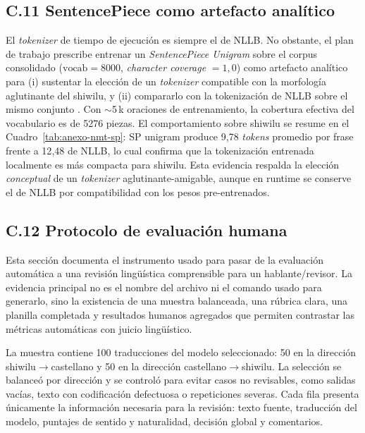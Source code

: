 \documentclass[12pt,a4paper,oneside]{book}
\begin{document}
\subsection*{C.11 SentencePiece como artefacto analítico}\label{anexo-nmt-sentencepiece}

El \emph{tokenizer} de tiempo de ejecución es siempre el de NLLB. No obstante, el plan de trabajo prescribe entrenar un \emph{SentencePiece Unigram} sobre el corpus consolidado (\(\text{vocab} = 8000\), \emph{character coverage} \(= 1{,}0\)) como artefacto analítico para (i) sustentar la elección de un \emph{tokenizer} compatible con la morfología aglutinante del shiwilu, y (ii) compararlo con la tokenización de NLLB sobre el mismo conjunto \parencite{kudo2018sentencepiece,sennrich2016bt}. Con \(\sim\)5\,k oraciones de entrenamiento, la cobertura efectiva del vocabulario es de 5276 piezas. El comportamiento sobre shiwilu se resume en el Cuadro~\ref{tab:anexo-nmt-sp}: SP unigram produce 9{,}78 \emph{tokens} promedio por frase frente a 12{,}48 de NLLB, lo cual confirma que la tokenización entrenada localmente es más compacta para shiwilu. Esta evidencia respalda la elección \emph{conceptual} de un \emph{tokenizer} aglutinante-amigable, aunque en runtime se conserve el de NLLB por compatibilidad con los pesos pre-entrenados.

\begin{table}[h]
\centering
\caption{Tokens promedio por oración de shiwilu: SP Unigram entrenado en este trabajo vs. el \emph{tokenizer} multilingüe de NLLB-200 (variante \texttt{xl}).}
\label{tab:anexo-nmt-sp}

\end{table}

\subsection*{C.12 Protocolo de evaluación humana}\label{anexo-nmt-human-eval}

Esta sección documenta el instrumento usado para pasar de la evaluación automática a una revisión lingüística comprensible para un hablante/revisor. La evidencia principal no es el nombre del archivo ni el comando usado para generarlo, sino la existencia de una muestra balanceada, una rúbrica clara, una planilla completada y resultados humanos agregados que permiten contrastar las métricas automáticas con juicio lingüístico.

La muestra contiene 100 traducciones del modelo seleccionado: 50 en la dirección shiwilu\(\rightarrow\)castellano y 50 en la dirección castellano\(\rightarrow\)shiwilu. La selección se balanceó por dirección y se controló para evitar casos no revisables, como salidas vacías, texto con codificación defectuosa o repeticiones severas. Cada fila presenta únicamente la información necesaria para la revisión: texto fuente, traducción del modelo, puntajes de sentido y naturalidad, decisión global y comentarios.
\end{document}

